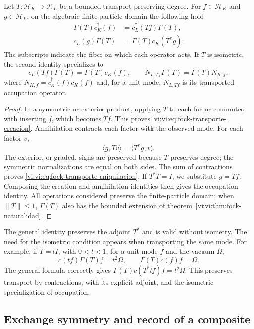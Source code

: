 \begin{proposition}
\label{vi:vi:prop:fock-transporte-adjunto}
Let \(T:\mathcal H_K\to\mathcal H_L\) be a bounded transport
preserving degree. For \(f\in\mathcal H_K\) and
\(g\in\mathcal H_L\), on the algebraic finite-particle
domain the following hold
\begin{align}
 \Gamma(T)c_K^\dagger(f)
 &=c_L^\dagger(Tf)\Gamma(T),
 \label{vi:vi:eq:fock-transporte-creacion}\\
 c_L(g)\Gamma(T)
 &=\Gamma(T)c_K(T^*g).
 \label{vi:vi:eq:fock-transporte-aniquilacion}
\end{align}
The subscripts indicate the fiber on which each operator acts.
If \(T\) is isometric, the second identity specializes to
\[
 c_L(Tf)\Gamma(T)=\Gamma(T)c_K(f),
 \qquad
 N_{L,Tf}\Gamma(T)=\Gamma(T)N_{K,f},
\]
where \(N_{K,f}=c_K^\dagger(f)c_K(f)\) and, for a unit mode,
\(N_{L,Tf}\) is its transported occupation operator.
\end{proposition}
\begin{proof}
In a symmetric or exterior product, applying \(T\) to each factor
commutes with inserting \(f\), which becomes \(Tf\). This
proves \eqref{vi:vi:eq:fock-transporte-creacion}. Annihilation
contracts each factor with the observed mode. For each factor \(v\),
\[
 \langle g,Tv\rangle=\langle T^*g,v\rangle.
\]
The exterior, or graded, signs are preserved because \(T\)
preserves degree; the symmetric normalizations are equal on
both sides. The sum of contractions proves
\eqref{vi:vi:eq:fock-transporte-aniquilacion}. If \(T^*T=I\), we
substitute \(g=Tf\). Composing the creation
and annihilation identities then gives the occupation identity. All operations
considered preserve the finite-particle domain; when
\(\|T\|\le1\), \(\Gamma(T)\) also has the bounded extension
of theorem~\ref{vi:vi:thm:fock-naturalidad}.
\end{proof}

The general identity preserves the adjoint \(T^*\) and is valid without
isometry. The need for the isometric condition appears when
transporting the same mode. For example, if \(T=tI\), with
\(0<t<1\), for a unit mode \(f\) and the vacuum \(\Omega\),
\[
 c(tf)\Gamma(T)f=t^2\Omega,
 \qquad \Gamma(T)c(f)f=\Omega.
\]
The general formula correctly gives
\(\Gamma(T)c(T^*tf)f=t^2\Omega\). This preserves
transport by contractions, with its explicit adjoint, and the
isometric specialization of occupation.

\subsection{Exchange symmetry and record of a composite}
\label{vi:vi:subsec:pauli-composicion}

